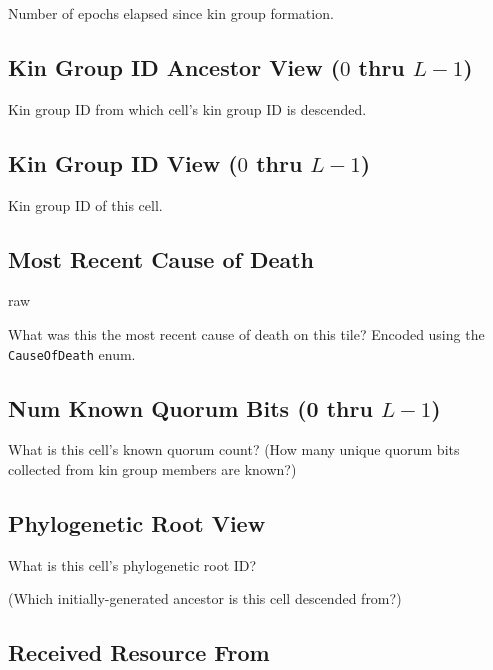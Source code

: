 
Number of epochs elapsed since kin group formation.

\subsection{Kin Group ID Ancestor View ($0$ thru $L - 1$)}


Kin group ID from which cell's kin group ID is descended.

\subsection{Kin Group ID View ($0$ thru $L - 1$)}


Kin group ID of this cell.

\subsection{Most Recent Cause of Death}{raw}


What was this the most recent cause of death on this tile?
Encoded using the \texttt{CauseOfDeath} enum.

\subsection{Num Known Quorum Bits (0 thru $L-1$)}


What is this cell's known quorum count?
(How many unique quorum bits collected from kin group members are known?)

\subsection{Phylogenetic Root View}


What is this cell's phylogenetic root ID?

(Which initially-generated ancestor is this cell descended from?)

\subsection{Received Resource From}

